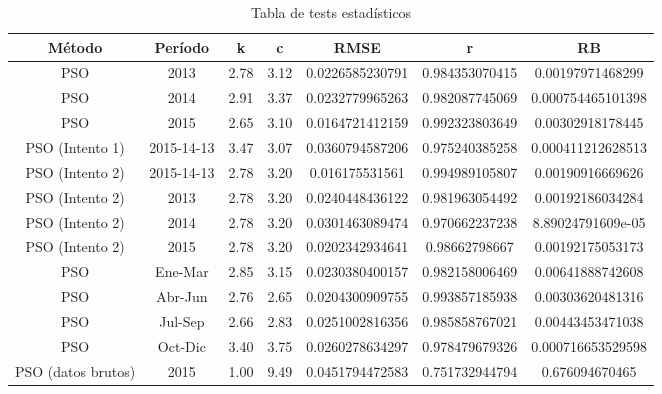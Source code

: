 \begin{table}[htb!]
    \centering
    \caption{Tabla de tests estadísticos}
    \label{table:stadistical_tests}
    \begin{tabular}{|c|c|c|c|c|c|c|}
        \hline
        \textbf{Método} & \textbf{Período} & \textbf{k} & \textbf{c} & \textbf{RMSE} & \textbf{r} & \textbf{RB}\\
        \hline
        PSO & 2013 & 2.78 & 3.12 &0.0226585230791 & 0.984353070415 & 0.00197971468299\\
        PSO & 2014 & 2.91 & 3.37 &0.0232779965263 & 0.982087745069 & 0.000754465101398\\
        PSO & 2015 & 2.65 & 3.10 &0.0164721412159 & 0.992323803649 & 0.00302918178445\\
        \hline
        PSO (Intento 1) & 2015-14-13 & 3.47 & 3.07 & 0.0360794587206 & 0.975240385258 & 0.000411212628513\\
        PSO (Intento 2) & 2015-14-13 & 2.78 & 3.20 & 0.016175531561 & 0.994989105807 & 0.00190916669626\\
        \hline
        PSO (Intento 2) & 2013 & 2.78 & 3.20 & 0.0240448436122 & 0.981963054492 & 0.00192186034284\\
        PSO (Intento 2) & 2014 & 2.78 & 3.20 & 0.0301463089474 & 0.970662237238 & 8.89024791609e-05\\
        PSO (Intento 2) & 2015 & 2.78 & 3.20 & 0.0202342934641 & 0.98662798667 & 0.00192175053173\\
        \hline
        PSO & Ene-Mar & 2.85 & 3.15 & 0.0230380400157 & 0.982158006469 & 0.00641888742608\\
        PSO & Abr-Jun & 2.76 & 2.65 & 0.0204300909755 & 0.993857185938 & 0.00303620481316\\
        PSO & Jul-Sep & 2.66 & 2.83 & 0.0251002816356 & 0.985858767021 & 0.00443453471038\\
        PSO & Oct-Dic & 3.40 & 3.75 & 0.0260278634297 & 0.978479679326 & 0.000716653529598\\
        \hline 
        PSO (datos brutos) & 2015 & 1.00 & 9.49 & 0.0451794472583 & 0.751732944794 & 0.676094670465\\ 
    \end{tabular}
\end{table}
\pagebreak
